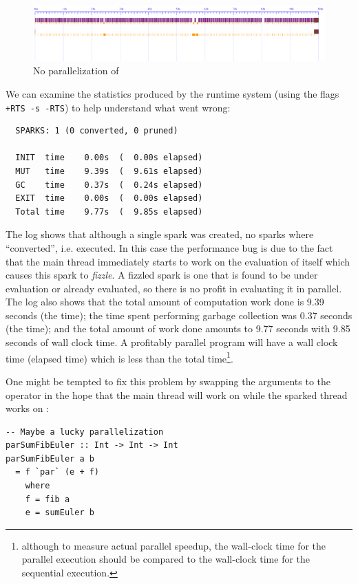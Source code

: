\begin{figure}
\begin{center}
\includegraphics[width=18cm]{SumEuler1-N2-eventlog.pdf}
\end{center}
\caption{No parallelization of }
\label{f:wrongpar}
\end{figure}

We can examine the statistics produced by the runtime system (using
the flags \texttt{+RTS -s -RTS}) to help understand what went wrong:

\begin{verbatim}
  SPARKS: 1 (0 converted, 0 pruned)

  INIT  time    0.00s  (  0.00s elapsed)
  MUT   time    9.39s  (  9.61s elapsed)
  GC    time    0.37s  (  0.24s elapsed)
  EXIT  time    0.00s  (  0.00s elapsed)
  Total time    9.77s  (  9.85s elapsed)
\end{verbatim}

The log shows that although a single spark was created, no sparks
where ``converted'', i.e. executed.  In this case the performance bug
is due to the fact that the main thread immediately starts to work on
the evaluation of  itself which causes this spark to
\emph{fizzle}.  A fizzled spark is one that is found to be under
evaluation or already evaluated, so there is no profit in evaluating
it in parallel. The log also shows that the total amount of
computation work done is 9.39 seconds (the  time); the time
spent performing garbage collection was 0.37 seconds (the 
time); and the total amount of work done amounts to 9.77 seconds with
9.85 seconds of wall clock time. A profitably parallel program will
have a wall clock time (elapsed time) which is less than the total
time\footnote{although to measure actual parallel speedup, the wall-clock time
  for the parallel execution should be compared to the wall-clock time
  for the sequential execution.}.

One might be tempted to fix this problem by swapping the arguments to
the \codef{+} operator in the hope that the main thread will work on
 while the sparked thread works on :

\begin{lstlisting}
-- Maybe a lucky parallelization
parSumFibEuler :: Int -> Int -> Int
parSumFibEuler a b
  = f `par` (e + f)
    where
    f = fib a
    e = sumEuler b
\end{lstlisting}

